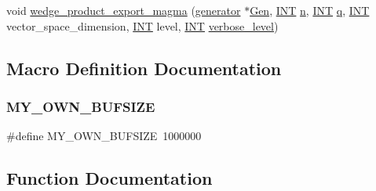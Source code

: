 \begin{DoxyCompactItemize}
\item 
void \mbox{\hyperlink{snakes__and__ladders__global_8_c_a089361716c9d4ced5fd32c64584e8648}{wedge\+\_\+product\+\_\+export\+\_\+magma}} (\mbox{\hyperlink{classgenerator}{generator}} $\ast$\mbox{\hyperlink{simeon_8_c_a77f431291e80a101f725d3a28a3f42c8}{Gen}}, \mbox{\hyperlink{galois_8h_a09fddde158a3a20bd2dcadb609de11dc}{I\+NT}} \mbox{\hyperlink{simeon_8_c_a7f2cd26777ce0ff3fdaf8d02aacbddfb}{n}}, \mbox{\hyperlink{galois_8h_a09fddde158a3a20bd2dcadb609de11dc}{I\+NT}} \mbox{\hyperlink{simeon_8_c_a92cbb483a3b27ae1a0dbfcb125ce216f}{q}}, \mbox{\hyperlink{galois_8h_a09fddde158a3a20bd2dcadb609de11dc}{I\+NT}} vector\+\_\+space\+\_\+dimension, \mbox{\hyperlink{galois_8h_a09fddde158a3a20bd2dcadb609de11dc}{I\+NT}} level, \mbox{\hyperlink{galois_8h_a09fddde158a3a20bd2dcadb609de11dc}{I\+NT}} \mbox{\hyperlink{simeon_8_c_a818073fbcc2f439e7c56952f67386122}{verbose\+\_\+level}})
\end{DoxyCompactItemize}


\subsection{Macro Definition Documentation}
\mbox{\label{snakes__and__ladders__global_8_c_a0463169ae06f05be3901c8692117ec7e}} 
\subsubsection{\texorpdfstring{M\+Y\+\_\+\+O\+W\+N\+\_\+\+B\+U\+F\+S\+I\+ZE}{MY\_OWN\_BUFSIZE}}
{\footnotesize\ttfamily \#define M\+Y\+\_\+\+O\+W\+N\+\_\+\+B\+U\+F\+S\+I\+ZE~1000000}



\subsection{Function Documentation}
\mbox{\label{snakes__and__ladders__global_8_c_af33697aede0480110b1227f727252637}} 
